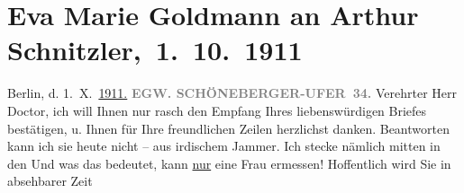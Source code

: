 

         
         \renewcommand{\erwaehntePersonen}{Personen: Eva Marie Goldmann, Paul Goldmann, Olga Schnitzler}
         \renewcommand{\erwaehnteInstitutionen}{Institutionen: Lessing-Theater}
         \renewcommand{\erwaehnteOrte}{Orte: Bendlerstraße, Berlin, Schöneberger Ufer, Wien}
         \renewcommand{\erwaehnteWerke}{Werke: Das weite Land. Tragikomödie in fünf Akten, Tagebuch}
               \section[ Eva Marie Goldmann an Arthur Schnitzler, 1. 10. 1911]{ Eva Marie Goldmann an Arthur Schnitzler, 1. 10. 1911}\nopagebreak{}\rehead{ }\begin{ledgroupsized}[t]{13cm}\normalsize\beginnumbering{} \toendnotes[C]{\smallbreak\pagebreak[2]} 
\toendnotes[C]{\smallbreak}\pstart
           \raggedleft{}{\pb}Berlin, d. 1. X. \uline{1911}\uline{.}\pend
           \pstart
           \textcolor{gray}{\textbf{EG}}\hfill \textcolor{gray}{\textbf{W. SCHÖNEBERGER-UFER 34.}}\pend
           \pstart{}Verehrter Herr Doctor,\pend\pstart
           ich will Ihnen nur rasch den Empfang Ihres liebenswürdigen Briefes bestätigen, u.
               Ihnen für Ihre freundlichen Zeilen herzlichst danken. Beantworten kann ich sie heute nicht – aus irdischem Jammer. {\pb}Ich stecke nämlich mitten in den \label{K_L03541-1v}\label{K_L03541-1h} Und was das bedeutet, kann \uline{nur} eine Frau ermessen!\pend
           \pstart
           Hoffentlich wird Sie in absehbarer Zeit \label{K_L03541-2v}
\end{ledgroupsized}
